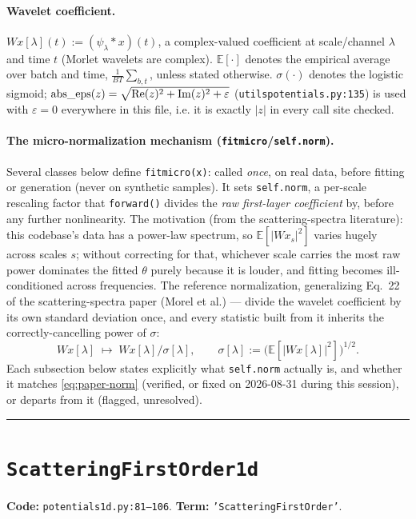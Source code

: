 \documentclass[11pt]{article}
\newcommand{\E}{\mathbb{E}}
\newcommand{\Wx}{W\!x}
\newcommand{\code}[1]{\texttt{#1}}
\renewcommand{\_}{\origunderscore\allowbreak} %
\begin{document}
\paragraph{Wavelet coefficient.} $\Wx[\lambda](t) := (\psi_\lambda * x)(t)$, a
complex-valued coefficient at scale/channel $\lambda$ and time $t$ (Morlet
wavelets are complex). $\E[\cdot]$ denotes the empirical average over batch and
time, $\frac{1}{BT}\sum_{b,t}$, unless stated otherwise. $\sigma(\cdot)$ denotes
the logistic sigmoid; $\mathrm{abs\_eps}(z) = \sqrt{\mathrm{Re}(z)^2+\mathrm{Im}(z)^2+\varepsilon}$
(\code{utils\_potentials.py:135}) is used with $\varepsilon=0$ everywhere in this
file, i.e. it is exactly $|z|$ in every call site checked.

\paragraph{The micro-normalization mechanism (\code{fit\_micro}/\code{self.norm}).}
Several classes below define \code{fit\_micro(x)}: called \emph{once}, on real
data, before fitting or generation (never on synthetic samples). It sets
\code{self.norm}, a per-scale rescaling factor that \code{forward()} divides the
\emph{raw first-layer coefficient} by, before any further nonlinearity. The
motivation (from the scattering-spectra literature): this codebase's data has a
power-law spectrum, so $\E[|\Wx_s|^2]$ varies hugely across scales $s$; without
correcting for that, whichever scale carries the most raw power dominates the
fitted $\theta$ purely because it is louder, and fitting becomes ill-conditioned
across frequencies. The reference normalization, generalizing Eq.~22 of the
scattering-spectra paper (Morel et al.) — divide the wavelet coefficient by its
own standard deviation once, and every statistic built from it inherits the
correctly-cancelling power of $\sigma$:
\begin{equation}
  \label{eq:paper-norm}
  \Wx[\lambda] \;\longmapsto\; \Wx[\lambda]/\sigma[\lambda], \qquad
  \sigma[\lambda] := \big(\E[|\Wx[\lambda]|^2]\big)^{1/2}.
\end{equation}
Each subsection below states explicitly what \code{self.norm} actually is, and
whether it matches \eqref{eq:paper-norm} (verified, or fixed on 2026-08-31 during
this session), or departs from it (flagged, unresolved).

\bigskip
\hrule
\bigskip

\section{\code{Scattering\_First\_Order\_1d}}
\textbf{Code:} \code{potentials\_1d.py:81--106}. \quad
\textbf{Term:} \code{'Scattering\_First\_Order'}.
\end{document}
